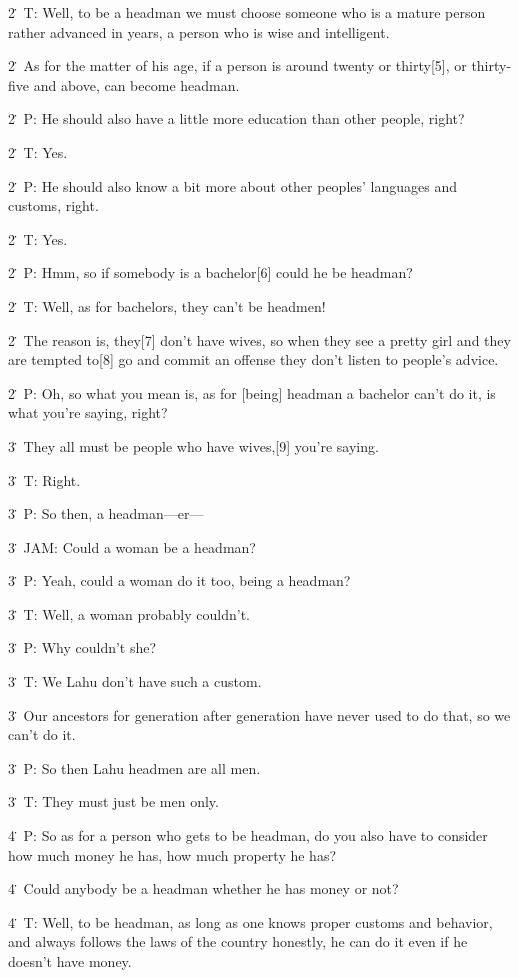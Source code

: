 {2\. T: Well, to be a headman we must choose someone who is a mature person
rather advanced in years, a person who is wise and intelligent.}

{2\. As for the matter of his age, if a person is around twenty or thirty[5],
or thirty-five and above, can become headman.}

{2\. P: He should also have a little more education than other people, right?}

{2\. T: Yes.}

{2\. P: He should also know a bit more about other peoples' languages and
customs, right.}

{2\. T: Yes.}

{2\. P: Hmm, so if somebody is a bachelor[6] could he be headman?}

{2\. T: Well, as for bachelors, they can't be headmen!}

{2\. The reason is, they[7] don't have wives, so when they see a pretty
girl and they are tempted to[8] go and commit an offense they don't listen to people's
advice.}

{2\. P: Oh, so what you mean is, as for [being] headman a bachelor can't
do it, is what you're saying, right?}

{3\. They all must be people who have wives,[9] you're saying.}

{3\. T: Right.}

{3\. P: So then, a headman---er---}

{3\. JAM: Could a woman be a headman?}

{3\. P: Yeah, could a woman do it too, being a headman?}

{3\. T: Well, a woman probably couldn't.}

{3\. P: Why couldn't she?}

{3\. T: We Lahu don't have such a custom.}

{3\. Our ancestors for generation after generation have never used to do
that, so we can't do it.}

{3\. P: So then Lahu headmen are all men.}

{3\. T: They must just be men only.}

{4\. P: So as for a person who gets to be headman, do you also have to consider
how much money he has, how much property he has?}

{4\. Could anybody be a headman whether he has money or not?}

{4\. T: Well, to be headman, as long as one knows proper customs and behavior,
and always follows the laws of the country honestly, he can do it even if he doesn't
have money.}

